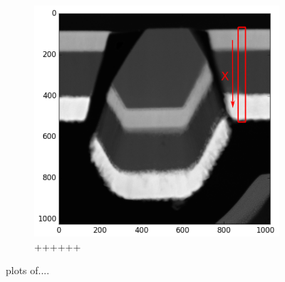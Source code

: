 \begin{figure}
\begin{subfigure}{.5\textwidth}
		\includegraphics[width=.68\linewidth]{fig/q/2_overview}
		\caption{++++++}
		\label{fig:zeta_area2_overview}
	\end{subfigure}
	\caption{plots of....}
	\label{fig:zeta_area2}
\end{figure}